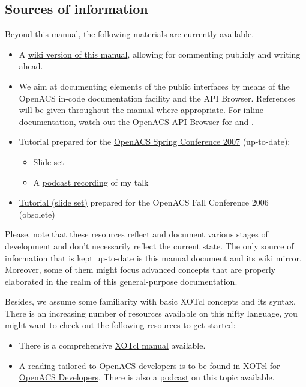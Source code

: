 \subsection{Sources of information}
Beyond this manual, the following materials are currently available.
\begin{itemize}
\item A \href{http://openacs-dotlrn.wu-wien.ac.at}{wiki version of this manual}, allowing for commenting 
publicly and writing ahead.
\item We aim at documenting elements of the public interfaces by means of the OpenACS in-code 
documentation facility and the API Browser. References will be given throughout the manual where 
appropriate. For inline documentation, watch out the OpenACS API Browser for  and .
\item Tutorial prepared for the \href{http://oacs-dotlrn-conf2007.wu-wien.ac.at/}{OpenACS Spring 
Conference 2007} (up-to-date):
\begin{itemize} 
\item \href{http://oacs-dotlrn-conf2007.wu-wien.ac.at/conf2007/file/sobernig-xosoap-slides.pdf?
m=download|Slide set}{Slide set}
\item A \href{http://oacs-dotlrn-conf2007.wu-wien.ac.at/conf2007/file/tutorial-sobernig.mp4?
m=download}{podcast recording} of my talk
\end{itemize}
\item \href{http://nm.wu-wien.ac.at/research/publications/b670.pdf}{Tutorial (slide set)} prepared for the 
OpenACS Fall Conference 2006 (obsolete) 
\end{itemize}
Please, note that these resources reflect and document various stages of development and don't 
necessarily reflect the current state. The only source of information that is kept up-to-date is this manual 
document and its wiki mirror. Moreover, some of them might focus advanced concepts that are properly 
elaborated in the realm of this general-purpose documentation.

Besides, we assume some familiarity with basic XOTcl concepts and its syntax. There is an increasing number of resources available on this nifty language, you might want to check out the following resources to get started:

\begin{itemize}
\item There is a comprehensive \href{http://media.wu-wien.ac.at/doc/tutorial.html}{XOTcl manual} available.
\item A reading tailored to OpenACS developers is to be found in \href{http://www.matuska.org/martin/doc/xotcl-openacs-2007.pdf}{XOTcl for OpenACS Developers}. There is also a \href{http://www.matuska.org/martin/doc/xotcl-openacs-2007-p.pdf}{podcast} on this topic available.
\end{itemize}
